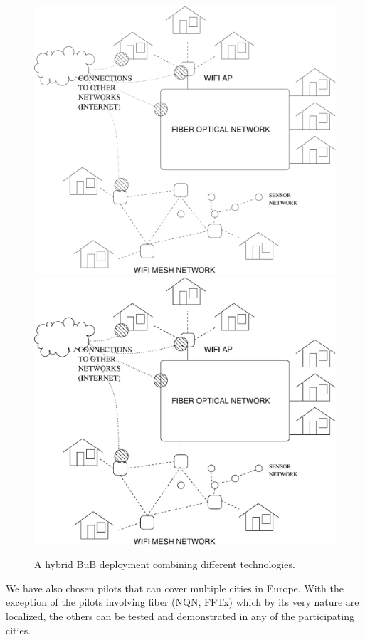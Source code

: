 \documentclass[draftclsnofoot,12pt,journal,onecolumn]{IEEEtran}
\begin{document}
\begin{figure}[!t]
\centering
\ifpdf
\includegraphics[width=\columnwidth]{figures/hybrid.pdf}
\else
\includegraphics[width=\columnwidth]{figures/hybrid.eps}
\fi
\caption{A hybrid BuB deployment combining different technologies.}
\label{fig:hybrid}
\end{figure}

We have also chosen pilots that can cover multiple cities in Europe.
With the exception of the pilots involving fiber (NQN, FFTx) which by its very nature are localized, the others can be tested and demonstrated in any of the participating cities.
\end{document}

